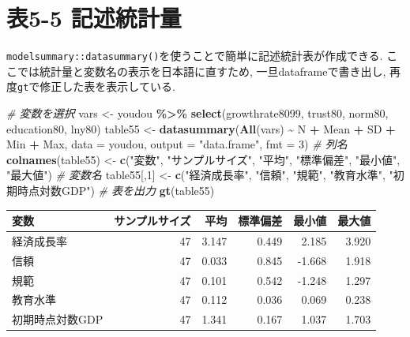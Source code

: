 \documentclass[
]{book}
\newenvironment{Shaded}{\begin{snugshade}}{\end{snugshade}}
\newcommand{\AttributeTok}[1]{\textcolor[rgb]{0.13,0.29,0.53}{#1}}
\newcommand{\CommentTok}[1]{\textcolor[rgb]{0.56,0.35,0.01}{\textit{#1}}}
\newcommand{\DecValTok}[1]{\textcolor[rgb]{0.00,0.00,0.81}{#1}}
\newcommand{\FunctionTok}[1]{\textcolor[rgb]{0.13,0.29,0.53}{\textbf{#1}}}
\newcommand{\NormalTok}[1]{#1}
\newcommand{\OtherTok}[1]{\textcolor[rgb]{0.56,0.35,0.01}{#1}}
\newcommand{\SpecialCharTok}[1]{\textcolor[rgb]{0.81,0.36,0.00}{\textbf{#1}}}
\newcommand{\StringTok}[1]{\textcolor[rgb]{0.31,0.60,0.02}{#1}}
\begin{document}
\hypertarget{ux88685-5-ux8a18ux8ff0ux7d71ux8a08ux91cf}{%
\section*{表5-5 記述統計量}\label{ux88685-5-ux8a18ux8ff0ux7d71ux8a08ux91cf}}

\texttt{modelsummary::datasummary()}を使うことで簡単に記述統計表が作成できる. ここでは統計量と変数名の表示を日本語に直すため, 一旦dataframeで書き出し, 再度\texttt{gt}で修正した表を表示している.

\begin{Shaded}
\begin{Highlighting}[]
\CommentTok{\# 変数を選択}
\NormalTok{vars }\OtherTok{\textless{}{-}}\NormalTok{ youdou }\SpecialCharTok{\%\textgreater{}\%}
    \FunctionTok{select}\NormalTok{(growthrate8099, trust80, norm80, education80, lny80)}
\NormalTok{table55 }\OtherTok{\textless{}{-}} \FunctionTok{datasummary}\NormalTok{(}\FunctionTok{All}\NormalTok{(vars) }\SpecialCharTok{\textasciitilde{}}\NormalTok{ N }\SpecialCharTok{+}\NormalTok{ Mean }\SpecialCharTok{+}\NormalTok{ SD }\SpecialCharTok{+}\NormalTok{ Min }\SpecialCharTok{+}\NormalTok{ Max,}
            \AttributeTok{data =}\NormalTok{ youdou,}
            \AttributeTok{output =} \StringTok{"data.frame"}\NormalTok{,}
            \AttributeTok{fmt =} \DecValTok{3}\NormalTok{)}
\CommentTok{\# 列名}
\FunctionTok{colnames}\NormalTok{(table55) }\OtherTok{\textless{}{-}} \FunctionTok{c}\NormalTok{(}\StringTok{"変数"}\NormalTok{, }\StringTok{"サンプルサイズ"}\NormalTok{, }\StringTok{"平均"}\NormalTok{, }\StringTok{"標準偏差"}\NormalTok{, }\StringTok{"最小値"}\NormalTok{, }\StringTok{"最大値"}\NormalTok{)}
\CommentTok{\# 変数名}
\NormalTok{table55[,}\DecValTok{1}\NormalTok{] }\OtherTok{\textless{}{-}} \FunctionTok{c}\NormalTok{(}\StringTok{"経済成長率"}\NormalTok{, }\StringTok{"信頼"}\NormalTok{, }\StringTok{"規範"}\NormalTok{, }\StringTok{"教育水準"}\NormalTok{, }\StringTok{"初期時点対数GDP"}\NormalTok{)}
\CommentTok{\# 表を出力}
\FunctionTok{gt}\NormalTok{(table55)}
\end{Highlighting}
\end{Shaded}

\begin{longtable}{lrrrrr}
\toprule
変数 & サンプルサイズ & 平均 & 標準偏差 & 最小値 & 最大値 \\ 
\midrule\addlinespace[2.5pt]
経済成長率 & 47 & 3.147 & 0.449 & 2.185 & 3.920 \\ 
信頼 & 47 & 0.033 & 0.845 & -1.668 & 1.918 \\ 
規範 & 47 & 0.101 & 0.542 & -1.248 & 1.297 \\ 
教育水準 & 47 & 0.112 & 0.036 & 0.069 & 0.238 \\ 
初期時点対数GDP & 47 & 1.341 & 0.167 & 1.037 & 1.703 \\ 
\bottomrule
\end{longtable}
\end{document}
